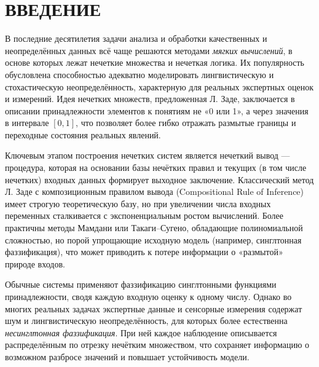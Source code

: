 
\section*{ВВЕДЕНИЕ}
\eskdrerun{}


В последние десятилетия задачи анализа и обработки качественных и неопределённых данных всё чаще решаются методами {\it мягких вычислений}, в основе которых лежат нечеткие множества и нечеткая логика. Их популярность обусловлена способностью адекватно моделировать лингвистическую и стохастическую неопределённость, характерную для реальных экспертных оценок и измерений. Идея нечетких множеств, предложенная Л. Заде, заключается в описании принадлежности элементов к понятиям не «0 или 1», а через значения в интервале $[0,1]$, что позволяет более гибко отражать размытые границы и переходные состояния реальных явлений.

Ключевым этапом построения нечетких систем является нечеткий вывод — процедура, которая на основании базы нечётких правил и текущих (в том числе нечетких) входных данных формирует выходное заключение. Классический метод Л. Заде с композиционным правилом вывода (Compositional Rule of Inference) имеет строгую теоретическую базу, но при увеличении числа входных переменных сталкивается с экспоненциальным ростом вычислений. Более практичны методы Мамдани или Такаги–Сугено, обладающие полиномиальной сложностью, но порой упрощающие исходную модель (например, синглтонная фаззификация), что может приводить к потере информации о «размытой» природе входов.

Обычные системы применяют фаззификацию синглтонными функциями принадлежности, сводя каждую входную оценку к одному числу. Однако во многих реальных задачах экспертные данные и сенсорные измерения содержат шум и лингвистическую неопределённость, для которых более естественна {\it несинглтонная фаззификация}. При ней каждое наблюдение описывается распределённым по отрезку нечётким множеством, что сохраняет информацию о возможном разбросе значений и повышает устойчивость модели.

